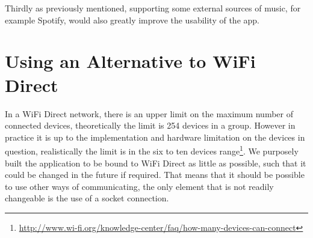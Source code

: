 Thirdly as previously mentioned, supporting some external sources of music, for example Spotify, would also greatly improve the usability of the app.

\section{Using an Alternative to WiFi Direct}
In a WiFi Direct network, there is an upper limit on the maximum number of connected devices, theoretically the limit is 254 devices in a group.
However in practice it is up to the implementation and hardware limitation on the devices in question, realistically the limit is in the six to ten devices range\footnote{\url{http://www.wi-fi.org/knowledge-center/faq/how-many-devices-can-connect}}.
We purposely built the application to be bound to WiFi Direct as little as possible, such that it could be changed in the future if required.
That means that it should be possible to use other ways of communicating, the only element that is not readily changeable is the use of a socket connection.





